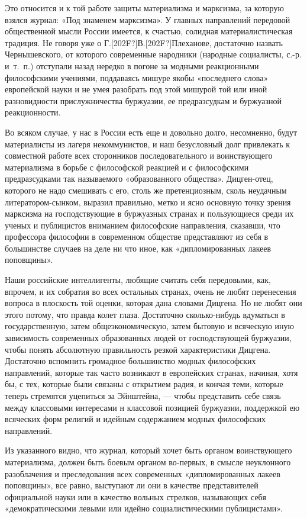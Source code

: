 \documentclass[twoside]{article}
\begin{document}
Это относится и к той работе защиты материализма и марксизма, за которую
взялся журнал: «Под знаменем марксизма». У главных направлений передовой
общественной мысли России имеется, к счастью, солидная материалистическая
традиция. Не говоря уже о
Г.\textlatin{[202F?]}В.\textlatin{[202F?]}Плеханове, достаточно назвать
Чернышевского, от которого современные народники (народные социалисты,
с.-р. и~т.~п.) отступали назад нередко в погоне за модными реакционными
философскими учениями, поддаваясь мишуре якобы «последнего слова»
европейской науки и не умея разобрать под этой мишурой той или иной
разновидности прислужничества буржуазии, ее предразсудкам и буржуазной
реакционности.

Во всяком случае, у нас в России есть еще и довольно долго, несомненно,
будут материалисты из лагеря некоммунистов, и наш безусловный долг
привлекать к совместной работе всех сторонников последовательного и
воинствующего материализма в борьбе с философской реакцией и с философскими
предразсудками так называемого «образованного общества». Дицген-отец,
которого не надо смешивать с его, столь же претенциозным, сколь неудачным
литератором-сынком, выразил правильно, метко и ясно основную точку зрения
марксизма на господствующие в буржуазных странах и пользующиеся среди их
ученых и публицистов вниманием философские направления, сказавши, что
профессора философии в современном обществе представляют из себя в
большинстве случаев на деле ни что иное, как «дипломированных лакеев
поповщины».

Наши российские интеллигенты, любящие считать себя передовыми, как, впрочем,
и их собратия во всех остальных странах, очень не любят перенесения вопроса
в плоскость той оценки, которая дана словами Дицгена. Но не любят они этого
потому, что правда колет глаза. Достаточно сколько-нибудь вдуматься в
государственную, затем общеэкономическую, затем бытовую и всяческую иную
зависимость современных образованных людей от господствующей буржуазии,
чтобы понять абсолютную правильность резкой характеристики Дицгена.
Достаточно вспомнить громадное большинство модных философских направлений,
которые так часто возникают в европейских странах, начиная, хотя бы, с тех,
которые были связаны с открытием радия, и кончая теми, которые теперь
стремятся уцепиться за Эйнштейна, — чтобы представить себе связь между
классовыми интересами н классовой позицией буржуазии, поддержкой ею
всяческих форм религий и идейным содержанием модных философских
направлений.

Из указанного видно, что журнал, который хочет быть органом воинствующего
материализма, должен быть боевым органом во-первых, в смысле неуклонного
разоблачения и преследования всех современных «дипломированных лакеев
поповщины», все равно, выступают ли они в качестве представителей
официальной науки или в качество вольных стрелков, называющих себя
«демократическими левыми или идейно социалистическими публицистами».
\end{document}
